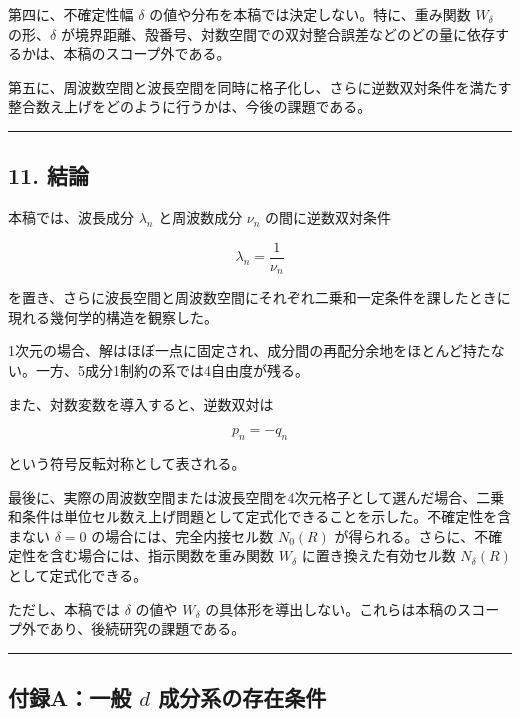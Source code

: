 \documentclass[
]{ltjsarticle}
\begin{document}
第四に、不確定性幅 \(\delta\)
の値や分布を本稿では決定しない。特に、重み関数 \(W_\delta\)
の形、\(\delta\)
が境界距離、殻番号、対数空間での双対整合誤差などのどの量に依存するかは、本稿のスコープ外である。

第五に、周波数空間と波長空間を同時に格子化し、さらに逆数双対条件を満たす整合数え上げをどのように行うかは、今後の課題である。

\begin{center}\rule{0.5\linewidth}{0.5pt}\end{center}

\subsection{11. 結論}\label{ux7d50ux8ad6}

本稿では、波長成分 \(\lambda_n\) と周波数成分 \(\nu_n\)
の間に逆数双対条件

\[
\lambda_n=\frac{1}{\nu_n}
\]

を置き、さらに波長空間と周波数空間にそれぞれ二乗和一定条件を課したときに現れる幾何学的構造を観察した。

1次元の場合、解はほぼ一点に固定され、成分間の再配分余地をほとんど持たない。一方、5成分1制約の系では4自由度が残る。

また、対数変数を導入すると、逆数双対は

\[
p_n=-q_n
\]

という符号反転対称として表される。

最後に、実際の周波数空間または波長空間を4次元格子として選んだ場合、二乗和条件は単位セル数え上げ問題として定式化できることを示した。不確定性を含まない
\(\delta=0\) の場合には、完全内接セル数 \(N_0(R)\)
が得られる。さらに、不確定性を含む場合には、指示関数を重み関数
\(W_\delta\) に置き換えた有効セル数 \(N_\delta(R)\) として定式化できる。

ただし、本稿では \(\delta\) の値や \(W_\delta\)
の具体形を導出しない。これらは本稿のスコープ外であり、後続研究の課題である。

\begin{center}\rule{0.5\linewidth}{0.5pt}\end{center}

\subsection{\texorpdfstring{付録A：一般 \(d\)
成分系の存在条件}{付録A：一般 d 成分系の存在条件}}\label{ux4ed8ux9332aux4e00ux822c-d-ux6210ux5206ux7cfbux306eux5b58ux5728ux6761ux4ef6}
\end{document}
